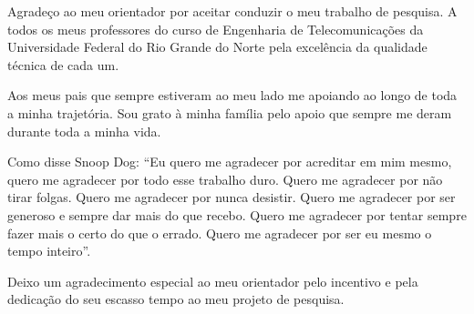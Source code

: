 \begin{agradecimentos}
Agradeço ao meu orientador por aceitar conduzir o meu trabalho de pesquisa.
A todos os meus professores do curso de Engenharia de Telecomunicações da Universidade Federal do Rio Grande do Norte pela excelência da qualidade técnica de cada um.

Aos meus pais que sempre estiveram ao meu lado me apoiando ao longo de toda a minha trajetória. Sou grato à minha família pelo apoio que sempre me deram durante toda a minha vida.

Como disse Snoop Dog: ``Eu quero me agradecer por acreditar em mim mesmo, quero me agradecer por todo esse trabalho duro. Quero me agradecer por não tirar folgas. Quero me agradecer por nunca desistir. Quero me agradecer por ser generoso e sempre dar mais do que recebo. Quero me agradecer por tentar sempre fazer mais o certo do que o errado. Quero me agradecer por ser eu mesmo o tempo inteiro''.

Deixo um agradecimento especial ao meu orientador pelo incentivo e pela dedicação do seu escasso tempo ao meu projeto de pesquisa.


\end{agradecimentos}
